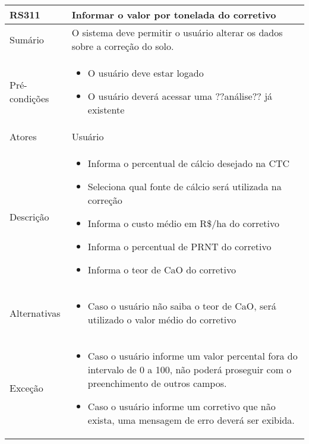 \begin{quadro}[!htb]
    \begin{tabular}{|p{3cm}|p{11cm}|}
        \hline
        \textbf{RS311} & \textbf{Informar o valor por tonelada do corretivo} \\
        \hline
        Sumário        & O sistema deve permitir o usuário alterar os dados sobre a correção do solo.                  \\
        \hline
        Pré-condições  & \begin{itemize}
            \item O usuário deve estar logado
            \item O usuário deverá acessar uma ??análise?? já existente 
        \end{itemize}                 \\
        \hline
        Atores         & Usuário                  \\
        \hline
        Descrição      &
        \begin{itemize}
            \item Informa o percentual de cálcio desejado na CTC
            \item Seleciona qual fonte de cálcio será utilizada na correção
            \item Informa o custo médio em R\$/ha do corretivo
            \item Informa o percentual de PRNT do corretivo
            \item Informa o teor de CaO do corretivo
        \end{itemize}                 \\
        \hline
        Alternativas   &
        \begin{itemize}
            \item Caso o usuário não saiba o teor de CaO, será utilizado o valor médio do corretivo
        \end{itemize}                 \\
        \hline
        Exceção        &
        \begin{itemize}
            \item Caso o usuário informe um valor percental fora do intervalo de 0 a 100, não poderá proseguir com o preenchimento de outros campos.
            \item Caso o usuário informe um corretivo que não exista, uma mensagem de erro deverá ser exibida.
        \end{itemize}                   \\
        \hline
    \end{tabular}
\end{quadro}

